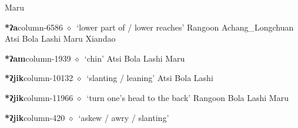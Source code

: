          Maru 
  \item {\footnotesize \textbf{*ʔa}}{\tiny column-6586}
         $\diamond$~`lower part of / lower reaches'
         Rangoon 
\hspace{1ex}
         Achang\_Longchuan 
\hspace{1ex}
         Atsi 
\hspace{1ex}
         Bola 
\hspace{1ex}
         Lashi 
\hspace{1ex}
         Maru 
\hspace{1ex}
         Xiandao 
  \item {\footnotesize \textbf{*ʔam}}{\tiny column-1939}
         $\diamond$~`chin'
         Atsi 
\hspace{1ex}
         Bola 
\hspace{1ex}
         Lashi 
\hspace{1ex}
         Maru 
  \item {\footnotesize \textbf{*ʔjik}}{\tiny column-10132}
         $\diamond$~`slanting / leaning'
         Atsi 
\hspace{1ex}
         Bola 
\hspace{1ex}
         Lashi 
  \item {\footnotesize \textbf{*ʔjik}}{\tiny column-11966}
         $\diamond$~`turn one's head to the back'
         Rangoon 
\hspace{1ex}
         Bola 
\hspace{1ex}
         Lashi 
\hspace{1ex}
         Maru 
  \item {\footnotesize \textbf{*ʔjik}}{\tiny column-420}
         $\diamond$~`askew / awry / slanting'

